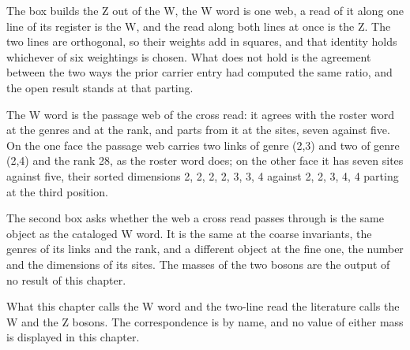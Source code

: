 The box builds the Z out of the W, the W word is one web, a read of it along one line of its register is the W, and the read along both lines at once is the Z. The two lines are orthogonal, so their weights add in squares, and that identity holds whichever of six weightings is chosen. What does not hold is the agreement between the two ways the prior carrier entry had computed the same ratio, and the open result stands at that parting.
\begin{chwall}\label{box:VI-2-w-and-the-z-and-their-masses:2}
The W word is the passage web of the cross read: it agrees with the roster word at the genres and at the rank, and parts from it at the sites, seven against five. On the one face the passage web carries two links of genre (2,3) and two of genre (2,4) and the rank 28, as the roster word does; on the other face it has seven sites against five, their sorted dimensions 2, 2, 2, 2, 3, 3, 4 against 2, 2, 3, 4, 4 parting at the third position.
\end{chwall}
The second box asks whether the web a cross read passes through is the same object as the cataloged W word. It is the same at the coarse invariants, the genres of its links and the rank, and a different object at the fine one, the number and the dimensions of its sites. The masses of the two bosons are the output of no result of this chapter.
\begin{chbridge}
What this chapter calls the W word and the two-line read the literature calls the W and the Z bosons. The correspondence is by name, and no value of either mass is displayed in this chapter.
\end{chbridge}
